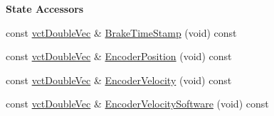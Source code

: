 \begin{Indent}{\bf State Accessors}
\begin{DoxyCompactItemize}
\item 
const \hyperlink{vct_dynamic_vector_types_8h_ade4b3068c86fb88f41af2e5187e491c2}{vct\-Double\-Vec} \& \hyperlink{classsaw_robot_i_o1394_1_1osa_robot1394_a768874a0b4053acb1444a879fa906b72}{Brake\-Time\-Stamp} (void) const 
\item 
const \hyperlink{vct_dynamic_vector_types_8h_ade4b3068c86fb88f41af2e5187e491c2}{vct\-Double\-Vec} \& \hyperlink{classsaw_robot_i_o1394_1_1osa_robot1394_a48592681f5ecec1241d2c49e6be891ad}{Encoder\-Position} (void) const 
\item 
const \hyperlink{vct_dynamic_vector_types_8h_ade4b3068c86fb88f41af2e5187e491c2}{vct\-Double\-Vec} \& \hyperlink{classsaw_robot_i_o1394_1_1osa_robot1394_ad48ab1de52591c73afa9ec0bdc9beac4}{Encoder\-Velocity} (void) const 
\item 
const \hyperlink{vct_dynamic_vector_types_8h_ade4b3068c86fb88f41af2e5187e491c2}{vct\-Double\-Vec} \& \hyperlink{classsaw_robot_i_o1394_1_1osa_robot1394_a2b246649d6ebdb5dfe339728319ef317}{Encoder\-Velocity\-Software} (void) const 
\end{DoxyCompactItemize}
\end{Indent}

